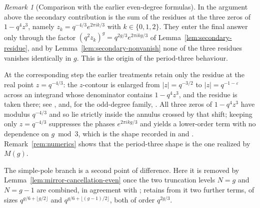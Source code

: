\documentclass[a4paper,reqno]{amsart}
\numberwithin{equation}{section}
\theoremstyle{remark}
\newtheorem{remark}[theorem]{Remark}
\theoremstyle{definition}
\begin{document}
\begin{remark}[Comparison with the earlier even-degree formulas]
\label{rem:comparison}
In the argument above the secondary contribution is the sum of the residues
at the three zeros of $1-q^4z^3$, namely $z_k=q^{-4/3}e^{2\pi ik/3}$ with $k\in\{0,1,2\}$. 
They enter the final answer only through the factor
$(q^2z_k)^g=q^{2g/3}e^{2\pi ikg/3}$ of Lemma~\ref{lem:secondary-residue},
and by Lemma~\ref{lem:secondary-nonvanish} none of the three residues
vanishes identically in $g$. This is the origin of the period-three
behaviour.

At the corresponding step the earlier treatments retain only the residue at
the real point $z=q^{-4/3}$: the $z$-contour is enlarged from $|z|=q^{-3/2}$
to $|z|=q^{-1-\varepsilon}$ across an integrand whose denominator contains
$1-q^4z^3$, and the residue is taken there; see \cite[Sections~3.2.1
and~3.2.2]{Ju20}, \cite[Lemma~5.7]{AM-21} and, for the odd-degree family,
\cite[Section~6]{Fl17-1}. All three zeros of $1-q^4z^3$ have modulus
$q^{-4/3}$ and so lie strictly inside the annulus crossed by that shift;
keeping only $z=q^{-4/3}$ suppresses the phases $e^{2\pi ikg/3}$ and yields
a lower-order term with no dependence on $g\bmod3$, which is the shape
recorded in \cite[Theorem~1.1]{Ju20} and \cite[Theorem~1.4]{AM-21}.
Remark~\ref{rem:numerics} shows that the period-three shape is the one
realized by $M(g)$.

The simple-pole branch is a second point of difference. Here it is removed
by Lemma~\ref{lem:mirror-cancellation-even} once the two truncation
levels $N=g$ and $N=g-1$ are combined, in agreement with
\cite[(4.5)]{Ju20}; \cite[(5.38)]{AM-21} retains from it two further terms,
of sizes $q^{g/6+\lfloor g/2\rfloor}$ and $q^{g/6+\lfloor(g-1)/2\rfloor}$,
both of order $q^{2g/3}$.
\end{remark}
\end{document}
